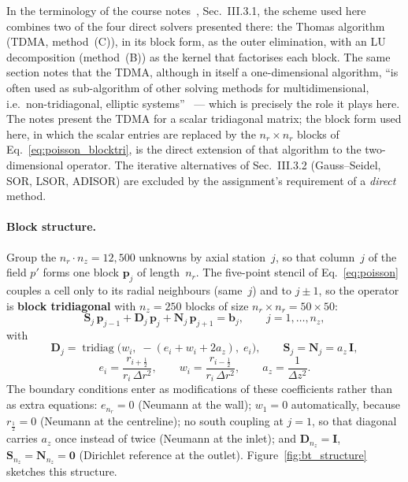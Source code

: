 \documentclass[12pt,a4paper]{article}
\begin{document}
In the terminology of the course notes~\cite{Steiner2025}, Sec.~III.3.1, the scheme used here
combines two of the four direct solvers presented there: the Thomas algorithm (TDMA, method~(C)),
in its block form, as the outer elimination, with an LU decomposition (method~(B)) as the kernel
that factorises each block.
The same section notes that the TDMA, although in itself a one-dimensional algorithm, ``is often
used as sub-algorithm of other solving methods for multidimensional, i.e.\ non-tridiagonal,
elliptic systems''~\cite{Steiner2025} --- which is precisely the role it plays here.
The notes present the TDMA for a scalar tridiagonal matrix; the block form used here, in which
the scalar entries are replaced by the $n_r \times n_r$ blocks of Eq.~\eqref{eq:poisson_blocktri},
is the direct extension of that algorithm to the two-dimensional operator.
The iterative alternatives of Sec.~III.3.2 (Gauss--Seidel, SOR, LSOR, ADISOR) are excluded by the
assignment's requirement of a \emph{direct} method.

\paragraph{Block structure.}
Group the $n_r \cdot n_z = 12{,}500$ unknowns by axial station~$j$, so that column~$j$ of the field $p'$ forms one block $\mathbf{p}_j$ of length~$n_r$.
The five-point stencil of Eq.~\eqref{eq:poisson} couples a cell only to its radial neighbours (same~$j$) and to $j \pm 1$, so the operator is \textbf{block tridiagonal} with $n_z = 250$ blocks of size $n_r \times n_r = 50 \times 50$:
\begin{equation}
    \mathbf{S}_j\,\mathbf{p}_{j-1} + \mathbf{D}_j\,\mathbf{p}_j + \mathbf{N}_j\,\mathbf{p}_{j+1} = \mathbf{b}_j,
    \qquad j = 1,\dots,n_z ,
    \label{eq:poisson_blocktri}
\end{equation}
with
\begin{equation}
    \mathbf{D}_j = \operatorname{tridiag}\!\big(w_i,\; -(e_i + w_i + 2a_z),\; e_i\big),
    \qquad
    \mathbf{S}_j = \mathbf{N}_j = a_z\,\mathbf{I} ,
\end{equation}
\begin{equation}
    e_i = \frac{r_{i+\frac{1}{2}}}{r_i\,\Delta r^2},
    \qquad
    w_i = \frac{r_{i-\frac{1}{2}}}{r_i\,\Delta r^2},
    \qquad
    a_z = \frac{1}{\Delta z^2} .
\end{equation}
The boundary conditions enter as modifications of these coefficients rather than as extra equations:
$e_{n_r} = 0$ (Neumann at the wall);
$w_1 = 0$ automatically, because $r_{\frac{1}{2}} = 0$ (Neumann at the centreline);
no south coupling at $j = 1$, so that diagonal carries $a_z$ once instead of twice (Neumann at the inlet);
and $\mathbf{D}_{n_z} = \mathbf{I}$, $\mathbf{S}_{n_z} = \mathbf{N}_{n_z} = \mathbf{0}$ (Dirichlet reference at the outlet).
Figure~\ref{fig:bt_structure} sketches this structure.
\end{document}
